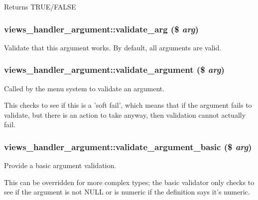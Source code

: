\begin{DoxyReturn}{Returns}
TRUE/FALSE 
\end{DoxyReturn}
\hypertarget{classviews__handler__argument_a7073b6fd3db280e88bd09d2517a9d767}{
\subsubsection[{validate\_\-arg}]{\setlength{\rightskip}{0pt plus 5cm}views\_\-handler\_\-argument::validate\_\-arg (\$ {\em arg})}}
\label{classviews__handler__argument_a7073b6fd3db280e88bd09d2517a9d767}
Validate that this argument works. By default, all arguments are valid. \hypertarget{classviews__handler__argument_aae090e0aaeabc60dfe06a0c892cabe36}{
\subsubsection[{validate\_\-argument}]{\setlength{\rightskip}{0pt plus 5cm}views\_\-handler\_\-argument::validate\_\-argument (\$ {\em arg})}}
\label{classviews__handler__argument_aae090e0aaeabc60dfe06a0c892cabe36}
Called by the menu system to validate an argument.

This checks to see if this is a 'soft fail', which means that if the argument fails to validate, but there is an action to take anyway, then validation cannot actually fail. \hypertarget{classviews__handler__argument_ab2ca8b443e4b53e1ca532faf0f4565f5}{
\subsubsection[{validate\_\-argument\_\-basic}]{\setlength{\rightskip}{0pt plus 5cm}views\_\-handler\_\-argument::validate\_\-argument\_\-basic (\$ {\em arg})}}
\label{classviews__handler__argument_ab2ca8b443e4b53e1ca532faf0f4565f5}
Provide a basic argument validation.

This can be overridden for more complex types; the basic validator only checks to see if the argument is not NULL or is numeric if the definition says it's numeric. 

